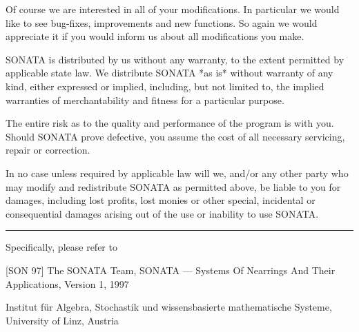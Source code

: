 Of course we are interested in all of your modifications.  In  particular
we would like to see bug-fixes, improvements and new functions.  So again
we would appreciate it if you would inform us about all modifications you
make.

SONATA is distributed by us without any warranty, to the extent permitted
by applicable state law.  We  distribute SONATA *as is* without  warranty
of any kind, either expressed or implied, including,  but not limited to,
the implied  warranties  of merchantability and  fitness for a particular
purpose.

The entire risk as to the quality and performance of the program is  with
you.  Should SONATA prove defective, you assume the cost of all necessary
servicing, repair or correction.

In no  case  unless  required by applicable law will we, and/or any other
party who  may  modify  and  redistribute  SONATA  as permitted above, be
liable  to you for damages, including lost profits, lost monies or  other
special, incidental or consequential damages  arising out  of the  use or
inability to use SONATA.

\vfill\hrule

\noindent\llap{\*\enspace}Specifically, please refer to

\smallskip \parindent4pc \parskip 0pt
\item{[SON 97]}
        The SONATA Team, SONATA --- Systems Of Nearrings And Their
        Applications, Version 1, 1997
\item{} Institut f\"ur Algebra, Stochastik und wissensbasierte
        mathematische Systeme,\hfill\break
        University of Linz, Austria

\endgroup



